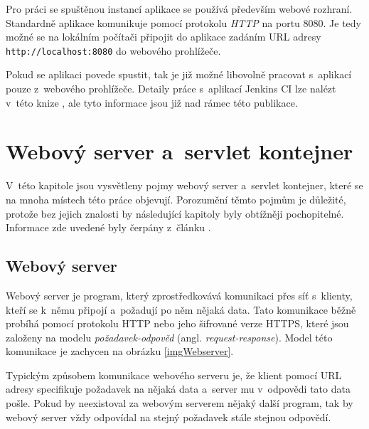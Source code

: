             Pro práci se spuštěnou instancí aplikace se používá především webové rozhraní. Standardně aplikace
            komunikuje pomocí protokolu \emph{HTTP} na portu 8080. Je tedy možné se na lokálním počítači připojit do aplikace zadáním URL adresy 
            \texttt{http://localhost:8080} do webového prohlížeče. 

            Pokud se aplikaci povede spustit, tak je již možné libovolně pracovat s~aplikací pouze z~webového prohlížeče. Detaily práce s~aplikací Jenkins CI
            lze nalézt v~této knize \cite{jenkinsBook}, ale tyto informace jsou již nad rámec této publikace.


            
       
    \section{Webový server a~servlet kontejner} \label{servletWebserver}
        V~této kapitole jsou vysvětleny pojmy webový server a~servlet kontejner, které se 
        na mnoha místech této práce objevují. Porozumění těmto pojmům je důležité, protože bez
        jejich znalosti by následující kapitoly byly obtížněji pochopitelné.
        Informace zde uvedené byly čerpány z~článku \cite{webserverVsServletPage}.

        \subsection{Webový server}
            Webový server je program, který zprostředkovává komunikaci přes síť s~klienty, kteří
            se k~němu připojí a~požadují po něm nějaká data. Tato komunikace běžně probíhá pomocí protokolu HTTP
            nebo jeho šifrované verze HTTPS,
            které jsou založeny na modelu \emph{požadavek-odpověd} (angl. \emph{request-response}).
            Model této komunikace je zachycen na obrázku \ref{imgWebserver}.
            
            Typickým způsobem komunikace webového serveru je, 
            že klient pomocí URL adresy specifikuje požadavek na nějaká
            data a~server mu v~odpovědi tato data pošle. Pokud by neexistoval za webovým serverem nějaký další
            program, tak by webový server vždy odpovídal na stejný požadavek stále stejnou odpovědí.

